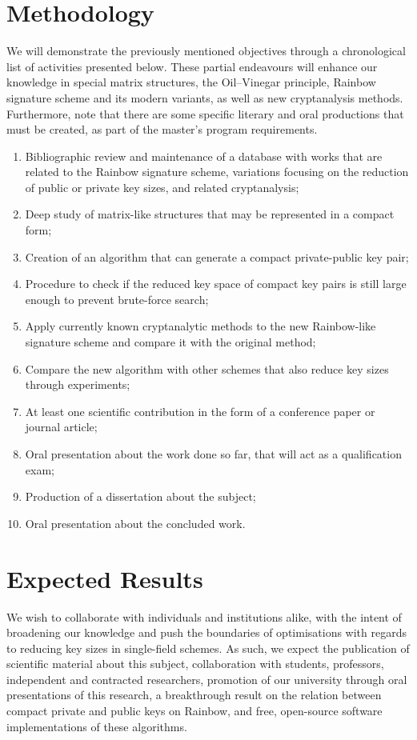 \documentclass[10pt]{article}
\begin{document}
\section{Methodology}

We will demonstrate the previously mentioned objectives through a chronological list of activities presented below. These partial endeavours will enhance our knowledge in special matrix structures, the Oil--Vinegar principle, Rainbow signature scheme and its modern variants, as well as new cryptanalysis methods. Furthermore, note that there are some specific literary and oral productions that must be created, as part of the master's program requirements.

\begin{enumerate}[label=\alph*.]
    \item Bibliographic review and maintenance of a database with works that are related to the Rainbow signature scheme, variations focusing on the reduction of public or private key sizes, and related cryptanalysis;
    \item Deep study of matrix-like structures that may be represented in a compact form;
    \item Creation of an algorithm that can generate a compact private-public key pair;
    \item Procedure to check if the reduced key space of compact key pairs is still large enough to prevent brute-force search;
    \item Apply currently known cryptanalytic methods to the new Rainbow-like signature scheme and compare it with the original method;
    \item Compare the new algorithm with other schemes that also reduce key sizes through experiments;
    \item At least one scientific contribution in the form of a conference paper or journal article;
    \item Oral presentation about the work done so far, that will act as a qualification exam;
    \item Production of a dissertation about the subject;
    \item Oral presentation about the concluded work.
\end{enumerate}

\section{Expected Results}

We wish to collaborate with individuals and institutions alike, with the intent of broadening our knowledge and push the boundaries of optimisations with regards to reducing key sizes in single-field schemes. As such, we expect the publication of scientific material about this subject, collaboration with students, professors, independent and contracted researchers, promotion of our university through oral presentations of this research, a breakthrough result on the relation between compact private and public keys on Rainbow, and free, open-source software implementations of these algorithms.



\end{document}

